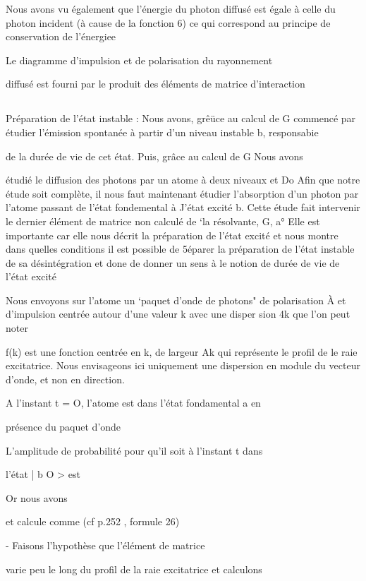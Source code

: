 Nous avons vu également que l'énergie du photon diffusé est
égale à celle du photon incident (à cause de la fonction 6) ce qui correspond au principe de conservation de l'énergiee

Le diagramme d'impulsion et de polarisation du rayonnement

diffusé est fourni par le produit des éléments de matrice d'interaction

\subsection{} Préparation de l'état instable :%
Nous avons, grêüce au calcul de G  commencé
par étudier l'émission spontanée à partir d'un niveau instable b, responsabie

de la durée de vie de cet état. Puis, grâce au calcul de G Nous avons

étudié le diffusion des photons par un atome à deux niveaux  et Do Afin que
notre étude soit complète, il nous faut maintenant étudier l'absorption d'un
photon par l'atome passant de l'état fondemental à J'état excité b. Cette
étude fait intervenir le dernier élément de matrice non calculé de ‘la résolvante, G, a° Elle est importante car elle nous décrit la préparation de
l'état excité et nous montre dans quelles conditions il est possible de 5éparer la préparation de l'état instable de sa désintégration et done de donner
un sens à le notion de durée de vie de l'état excité

Nous envoyons sur l'atome un ‘paquet d'onde de photons" de
polarisation À et d'impulsion centrée autour d'une valeur k avec une disper
sion 4k que l'on peut noter

f(k) est une fonction centrée en k, de largeur Ak qui représente le profil de
le raie excitatrice. Nous envisageons ici uniquement une dispersion en module
du vecteur d'onde, et non en direction.

A l'instant t = O, l'atome est dans l'état fondamental a en

présence du paquet d'onde

L'amplitude de probabilité pour qu'il soit à l'instant t dans

l'état | b O > est

Or nous avons

et  calcule comme  (cf p.252 , formule 26)

- Faisons l'hypothèse que l'élément de matrice 

varie peu le long du profil de la raie excitatrice et calculons

